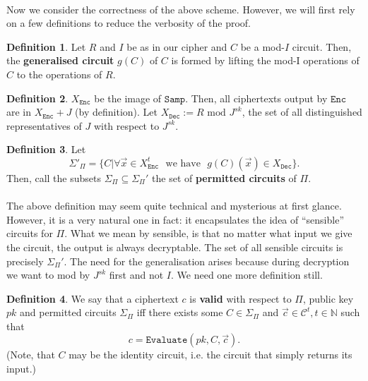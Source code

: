 \documentclass{article}
\theoremstyle{definition}
\newtheorem{definition}{Definition}[section]
\theoremstyle{example}
\newcommand{\Enc}{\texttt{Enc}}
\newcommand{\Dec}{\texttt{Dec}}
\newcommand{\Evaluate}{\texttt{Evaluate}}
\renewcommand{\C}{\mathcal{C}}
\newcommand{\Nat}{\mathbb{N}}
\renewcommand{\mod}{\,\,\text{mod}\,\,}
\newcommand{\Samp}{\texttt{Samp}}
\begin{document}
\paragraph{} Now we consider the correctness of the above scheme. However, we
will first rely on a few definitions to reduce the verbosity of the proof.
\begin{definition}
  Let $R$ and $I$ be as in our cipher and $C$ be a mod-$I$ circuit. Then, the \textbf{generalised circuit} $g(C)$ of
  $C$ is formed by lifting the mod-I operations of $C$ to the operations of $R$.
\end{definition}
\begin{definition}
  $X_\Enc$ be the image of $\Samp$. Then, all ciphertexts output by $\Enc$
  are in $X_\Enc + J$ (by definition). Let $X_\Dec := R \mod J^{sk}$, the set of
  all distinguished representatives of $J$ with respect to $J^{sk}$.  
\end{definition}
\begin{definition}
\label{def:perm_circuits}
  Let
  \[
    \Sigma'_\Pi = \{C | \forall \vec{x} \in X_\Enc^t \,\,\text{ we have }\,\,
    g(C)(\vec{x}) \in X_\Dec\}.
  \]
  Then, call the subsets $\Sigma_\Pi \subseteq \Sigma_\Pi'$ the set of \textbf{permitted
  circuits} of $\Pi$.
\end{definition}
\paragraph{} The above definition may seem quite technical and mysterious at
first glance. However, it is a very natural one in fact: it encapsulates the
idea of ``sensible'' circuits for $\Pi$. What we mean by sensible, is that no matter
what input we give the circuit, the output is always decryptable. The set of all
sensible circuits is precisely $\Sigma_\Pi'$. The need for the generalisation arises
because during decryption we want to mod by $J^{sk}$ first and not $I$. We need
one more definition still.
\begin{definition}
  We say that a ciphertext $c$ is \textbf{valid} with respect to $\Pi$, public
  key $pk$ and permitted circuits $\Sigma_\Pi$ iff there exists some $C \in \Sigma_\Pi$
  and $\vec{c} \in \C^t, t \in \Nat$ such that
  \[
    c = \Evaluate(pk, C, \vec{c}).
  \]
  (Note, that $C$ may be the identity circuit, i.e. the circuit that simply
  returns its input.)
\end{definition}
\end{document}
